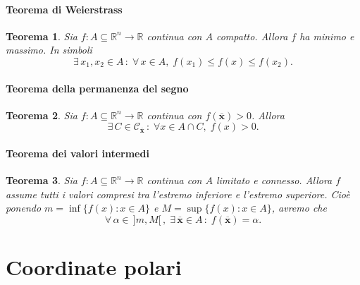 \documentclass{article}
\theoremstyle{plain}
\newtheorem{thm}{Teorema}[section]
\theoremstyle{definition}
\theoremstyle{remark}
\begin{document}
\paragraph{Teorema di Weierstrass}
\begin{bxthm}
\begin{thm}
    Sia $f:A\subseteq\mathbb{R}^n\to\mathbb{R}$ continua con $A$ compatto.
    Allora $f$ ha minimo e massimo. In simboli 
    \[\exists\,x_1,x_2\in A\,:\;\forall\, x\in A,\;f(x_1)\leq f(x)\leq f(x_2).\]
\end{thm}
\end{bxthm}

\vspace{10pt}

\paragraph{Teorema della permanenza del segno}
\begin{bxthm}
\begin{thm}
    Sia $f:A\subseteq\mathbb{R}^n\to\mathbb{R}$ continua con $f(\overline{\mathbf{x}})>0$. Allora 
    \[\exists\,C\in\mathcal{C}_{\overline{\mathbf{x}}}\,:\;\forall x\in A\cap C,\; f(x)>0.\]
\end{thm}
\end{bxthm}

\vspace{10pt}

\paragraph{Teorema dei valori intermedi}
\begin{bxthm}
\begin{thm}
    Sia $f:A\subseteq\mathbb{R}^n\to\mathbb{R}$ continua con $A$ limitato e connesso.
    Allora $f$ assume tutti i valori compresi tra l'estremo inferiore e l'estremo superiore.
    Cioè ponendo $m=\inf\{f(x):x\in A\}$ e $M=\sup\{f(x):x\in A\}$, avremo che 
    \[\forall\,\alpha\in\,]m,M[\,,\;\exists\,\overline{\mathbf{x}}\in A\,:\;f(\overline{\mathbf{x}})=\alpha.\]
\end{thm}
\end{bxthm}

\vspace{10pt}

\section{Coordinate polari}
\end{document}
